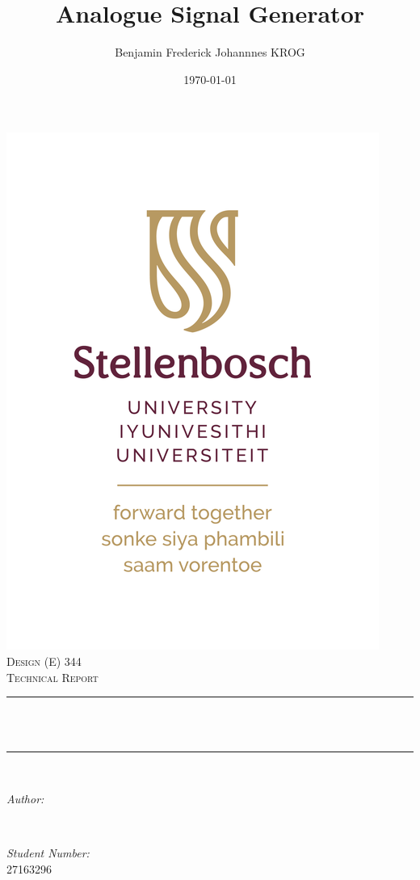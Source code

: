 \documentclass[11pt,a4paper]{article}
\title{Analogue Signal Generator} %
\author{Benjamin Frederick Johannnes KROG \textsc{}} %
\date{\today} %
\makeatletter
\let\thetitle\@title
\let\theauthor\@author
\let\thedate\@date
\makeatother
\begin{document}
\begin{titlepage}
    \centering
    \vspace*{0.5 cm}
    \includegraphics[scale = 1.5]{SU_logo_RGB-01.png}\\[1.0 cm]   %
    \textsc{\LARGE Design (E) 344 \\ Technical Report}\\[0.5 cm]               %
    \rule{\linewidth}{0.2 mm} \\[0.4 cm]
    { \huge \bfseries \thetitle }\\[0.4 cm]
    \rule{\linewidth}{0.2 mm} \\[1.5 cm]
    
    \begin{minipage}{6.5cm}
    	\begin{flushleft} \large
    		\emph{Author:}\\
    		\theauthor
    	\end{flushleft}
    \end{minipage}~
    \begin{minipage}{6.5cm}
    	\begin{flushright} \large
    		\emph{Student Number:} \\
    		{27163296}                                 %
    	\end{flushright}
    \end{minipage}\\[2 cm]
    
    {\large \thedate}\\[2 cm]
    
    \vfill
    
\end{titlepage}
\end{document}
